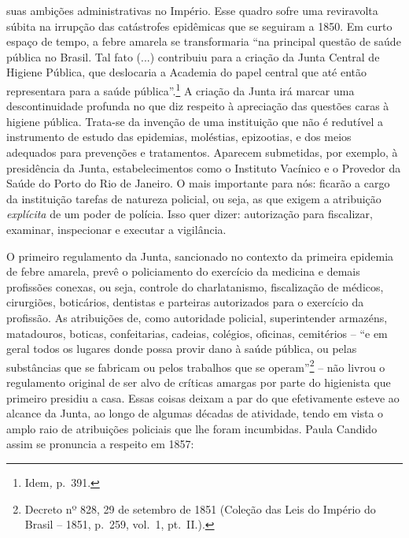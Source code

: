 suas ambições administrativas no Império. Esse quadro sofre uma
reviravolta súbita na irrupção das catástrofes epidêmicas que se
seguiram a 1850. Em curto espaço de tempo, a febre amarela se
transformaria ``na principal questão de saúde pública no Brasil. Tal
fato (...) contribuiu para a criação da Junta Central de Higiene
Pública, que deslocaria a Academia do papel central que até então
representara para a saúde pública''.\footnote{Idem\emph{,} p.~391.} A
criação da Junta irá marcar uma descontinuidade profunda no que diz
respeito à apreciação das questões caras à higiene pública. Trata-se da
invenção de uma instituição que não é redutível a instrumento de estudo
das epidemias, moléstias, epizootias, e dos meios adequados para
prevenções e tratamentos. Aparecem submetidas, por exemplo, à
presidência da Junta, estabelecimentos como o Instituto Vacínico e o
Provedor da Saúde do Porto do Rio de Janeiro. O mais importante para
nós: ficarão a cargo da instituição tarefas de natureza policial, ou
seja, as que exigem a atribuição \emph{explícita} de um poder de
polícia. Isso quer dizer: autorização para fiscalizar, examinar,
inspecionar e executar a vigilância.

O primeiro regulamento da Junta, sancionado no contexto da primeira
epidemia de febre amarela, prevê o policiamento do exercício da medicina
e demais profissões conexas, ou seja, controle do charlatanismo,
fiscalização de médicos, cirurgiões, boticários, dentistas e parteiras
autorizados para o exercício da profissão. As atribuições de, como
autoridade policial, superintender armazéns, matadouros, boticas,
confeitarias, cadeias, colégios, oficinas, cemitérios -- ``e em geral
todos os lugares donde possa provir dano à saúde pública, ou pelas
substâncias que se fabricam ou pelos trabalhos que se operam''\footnote{Decreto
  nº 828, 29 de setembro de 1851 (Coleção das Leis do Império do Brasil
  -- 1851, p.~259, vol.~1, pt.~II.).} -- não livrou o regulamento
original de ser alvo de críticas amargas por parte do higienista que
primeiro presidiu a casa. Essas coisas deixam a par do que efetivamente
esteve ao alcance da Junta, ao longo de algumas décadas de atividade,
tendo em vista o amplo raio de atribuições policiais que lhe foram
incumbidas. Paula Candido assim se pronuncia a respeito em 1857:

